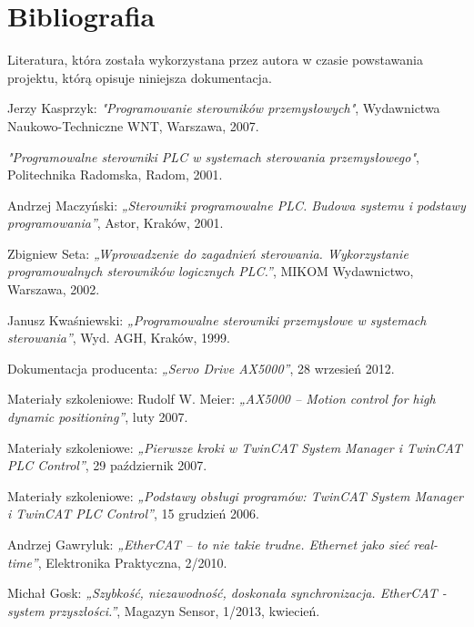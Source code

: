 \section{Bibliografia}
Literatura, która została wykorzystana przez autora w czasie powstawania projektu, którą opisuje niniejsza dokumentacja.

\begin{thebibliography}{99}
{} 
Jerzy Kasprzyk: 
\emph{"Programowanie sterowników przemysłowych"},
Wydawnictwa Naukowo-Techniczne WNT, 
Warszawa, 
2007.      

\emph{"Programowalne sterowniki PLC w systemach sterowania przemysłowego"}, 
Politechnika Radomska, 
Radom,
2001.

Andrzej Maczyński:
\emph{„Sterowniki programowalne PLC. Budowa systemu i podstawy programowania”},
Astor, 
Kraków,
2001. 

Zbigniew Seta: 
\emph{„Wprowadzenie do zagadnień sterowania. Wykorzystanie programowalnych sterowników logicznych PLC.”},
MIKOM Wydawnictwo, 
Warszawa,
2002. 

Janusz Kwaśniewski: 
\emph{„Programowalne sterowniki przemysłowe w systemach sterowania”}, 
Wyd. AGH, 
Kraków,
1999.

Dokumentacja producenta: 
\emph{„Servo Drive AX5000”}, 
28 wrzesień 2012.

Materiały szkoleniowe: Rudolf W. Meier:
\emph{„AX5000 – Motion control for high dynamic positioning”},
luty 2007.

Materiały szkoleniowe:
\emph{„Pierwsze kroki w TwinCAT System Manager i TwinCAT PLC Control”},
29 październik 2007.

Materiały szkoleniowe:
\emph{„Podstawy obsługi programów: TwinCAT System Manager i TwinCAT PLC Control”},
15 grudzień 2006.

Andrzej Gawryluk:
\emph{„EtherCAT – to nie takie trudne. Ethernet jako sieć real-time”},
Elektronika Praktyczna, 2/2010.

Michał Gosk:
\emph{„Szybkość, niezawodność, doskonała synchronizacja. EtherCAT - system przyszłości.”},
Magazyn Sensor, 1/2013, kwiecień.
\end{thebibliography}

